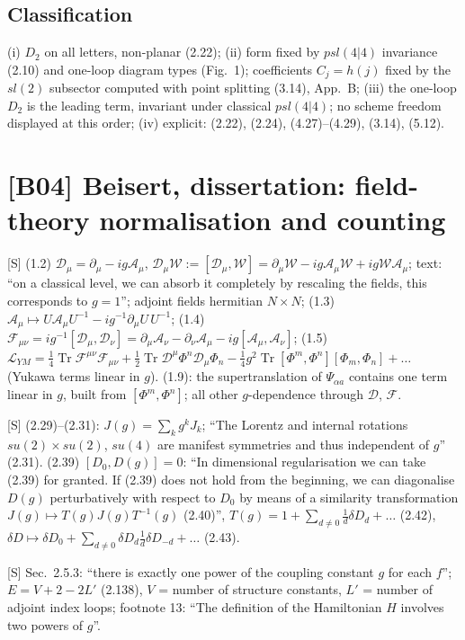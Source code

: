 \documentclass[10pt]{article}
\begin{document}
\subsection{Classification}
(i) $D_2$ on all letters, non-planar (2.22); (ii) form fixed by $psl(4|4)$ invariance (2.10) and one-loop diagram types (Fig.\ 1); coefficients $C_j=h(j)$ fixed by the $sl(2)$ subsector computed with point splitting (3.14), App.\ B; (iii) the one-loop $D_2$ is the leading term, invariant under classical $psl(4|4)$; no scheme freedom displayed at this order; (iv) explicit: (2.22), (2.24), (4.27)--(4.29), (3.14), (5.12).

\section{[B04] Beisert, dissertation: field-theory normalisation and counting}
[S] (1.2) $\mathcal D_\mu=\partial_\mu-ig\mathcal A_\mu$, $\mathcal D_\mu\mathcal W:=[\mathcal D_\mu,\mathcal W]=\partial_\mu\mathcal W-ig\mathcal A_\mu\mathcal W+ig\mathcal W\mathcal A_\mu$; text: ``on a classical level, we can absorb it completely by rescaling the fields, this corresponds to $g=1$''; adjoint fields hermitian $N\times N$; (1.3) $\mathcal A_\mu\mapsto U\mathcal A_\mu U^{-1}-ig^{-1}\partial_\mu U\,U^{-1}$; (1.4) $\mathcal F_{\mu\nu}=ig^{-1}[\mathcal D_\mu,\mathcal D_\nu]=\partial_\mu\mathcal A_\nu-\partial_\nu\mathcal A_\mu-ig[\mathcal A_\mu,\mathcal A_\nu]$; (1.5) $\mathcal L_{YM}=\frac14\operatorname{Tr}\mathcal F^{\mu\nu}\mathcal F_{\mu\nu}+\frac12\operatorname{Tr}\mathcal D^\mu\Phi^n\mathcal D_\mu\Phi_n-\frac14g^2\operatorname{Tr}[\Phi^m,\Phi^n][\Phi_m,\Phi_n]+\dots$ (Yukawa terms linear in $g$). (1.9): the supertranslation of $\Psi_{\alpha a}$ contains one term linear in $g$, built from $[\Phi^m,\Phi^n]$; all other $g$-dependence through $\mathcal D$, $\mathcal F$.

[S] (2.29)--(2.31): $J(g)=\sum_kg^kJ_k$; ``The Lorentz and internal rotations $su(2)\times su(2)$, $su(4)$ are manifest symmetries and thus independent of $g$'' (2.31). (2.39) $[D_0,D(g)]=0$: ``In dimensional regularisation we can take (2.39) for granted. If (2.39) does not hold from the beginning, we can diagonalise $D(g)$ perturbatively with respect to $D_0$ by means of a similarity transformation $J(g)\mapsto T(g)J(g)T^{-1}(g)$ (2.40)'', $T(g)=1+\sum_{d\neq0}\frac1d\delta D_d+\dots$ (2.42), $\delta D\mapsto\delta D_0+\sum_{d\neq0}\delta D_d\frac1d\delta D_{-d}+\dots$ (2.43).

[S] Sec.\ 2.5.3: ``there is exactly one power of the coupling constant $g$ for each $f$''; $E=V+2-2L'$ (2.138), $V$ = number of structure constants, $L'$ = number of adjoint index loops; footnote 13: ``The definition of the Hamiltonian $H$ involves two powers of $g$''.
\end{document}
